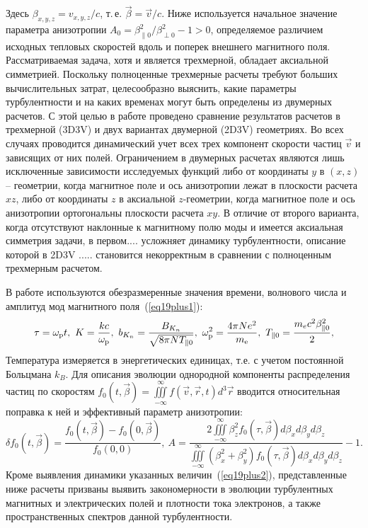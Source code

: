 Здесь $\beta_{x,y,z}={v_{x,y,z}}/{c}$, т.\,е. $\vec{\beta}=\vec{v}/{c}$. Ниже используется начальное значение параметра анизотропии $A_0={\beta^2_{\| 0}}/{\beta^2_{\perp 0}}-1 > 0$, определяемое различием исходных тепловых скоростей вдоль и поперек внешнего магнитного поля. Рассматриваемая задача, хотя и является трехмерной, обладает аксиальной симметрией. Поскольку полноценные трехмерные расчеты требуют больших вычислительных затрат, целесообразно выяснить, какие параметры турбулентности и на каких временах могут быть определены из двумерных расчетов. С этой целью в работе проведено сравнение результатов расчетов в трехмерной (3D3V) и двух вариантах двумерной (2D3V) геометриях. Во всех случаях проводится динамический учет всех трех компонент скорости частиц $\vec{v}$ и зависящих от них полей.  Ограничением в двумерных расчетах являются лишь исключенные зависимости исследуемых функций либо от координаты $y$  в $(x,z)$ -- геометрии, когда магнитное поле и ось анизотропии лежат в плоскости расчета $xz$, либо от координаты $z$ в аксиальной $z$-геометрии, когда магнитное поле и ось анизотропии ортогональны плоскости расчета $xy$.  В отличие от второго варианта, когда отсутствуют наклонные к магнитному полю моды и имеется аксиальная симметрия задачи, в первом.... усложняет динамику турбулентности, описание которой в 2D3V ..... становится некорректным в сравнении с полноценным трехмерным расчетом.
 
В работе используются обезразмеренные значения времени, волнового числа и амплитуд мод магнитного поля~(\ref{eq19plus1}):
\begin{equation}
\label{eq19plus1}
   \tau=\wpl t, \
    K=\dfrac{kc}{\wpl}, \  b_{K_{n}}=\dfrac{B_{K_{n}}}{\sqrt{8\pi N T_{\|0}}},\ 
    \wpl^2=\dfrac{4\pi Ne^2}{\me},\
    T_{\|0}=\dfrac{m_ec^2\beta_{\|0}^2}{2},
\end{equation}
Температура измеряется в энергетических единицах, т.е. с учетом постоянной Больцмана $k_B$. Для описания эволюции однородной компоненты распределения частиц по скоростям $f_0(t,\overrightarrow{\beta})=\iiint\limits^{\infty}_{-\infty}f(\vec{v},\vec{r}, t) d^3\vec{r}$ вводится относительная поправка к ней и эффективный параметр анизотропии:
\begin{equation}
\label{eq19plus2}
    \delta f_{0}(t,\overrightarrow{\beta})=\frac{f_0(t,\overrightarrow{\beta})-f_0(0,\overrightarrow{\beta})}{f_0(0,0)},\ A=\frac{2\iiint\limits^{\infty}_{-\infty}\beta_z^2f_{0}(\tau,\overrightarrow{\beta}) d\beta_x d\beta_yd\beta_z}{\iiint\limits^{\infty}_{-\infty}\left(\beta_x^2+\beta_y^2\right)f_{0}(\tau,\overrightarrow{\beta}) d\beta_x d\beta_y d\beta_z}-1 .   
\end{equation}
Кроме выявления динамики указанных величин~(\ref{eq19plus2}), представленные ниже расчеты призваны выявить закономерности в эволюции турбулентных магнитных и электрических полей и плотности тока электронов, а также пространственных спектров данной турбулентности.

